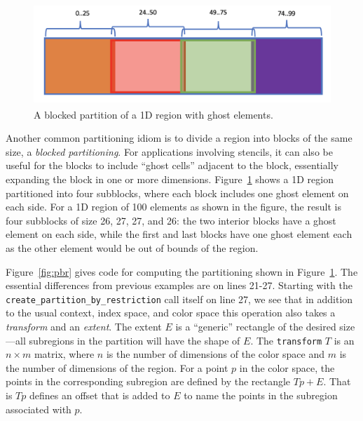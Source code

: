 \begin{figure}
  \includegraphics[height=1.5in]{figs/pbr.png}
  \caption{A blocked partition of a 1D region with ghost elements.}
  \label{fig:1dpbr}
\end{figure}

Another common partitioning idiom is to divide a region into blocks of the same size, a {\em blocked partitioning}.  For applications involving stencils, it can
also be useful for the blocks to include ``ghost cells'' adjacent to the block, essentially expanding the block in one or more dimensions.
Figure~\ref{fig:1dpbr} shows a 1D region partitioned into four subblocks, where each block includes one ghost element on each side.  For
a 1D region of 100 elements as shown in the figure, the result is four subblocks of size 26, 27, 27, and 26:  the two interior blocks have a ghost element on each side, while the first and last blocks have one ghost element each as the other element would be out of bounds of the region.

Figure~\ref{fig:pbr} gives code for computing the partitioning shown in Figure~\ref{fig:1dpbr}.  The essential differences from previous
  examples are on lines 21-27.  Starting with the {\tt create\_partition\_by\_restriction} call itself on line 27, we see that in addition to the
  usual context, index space, and color space this operation also takes a {\em transform} and an {\em extent}.  The extent $E$ is a ``generic''
  rectangle of the desired size---all subregions in the partition will have the shape of $E$.  The {\tt transform} $T$ is an
  $n \times m$ matrix, where $n$ is the number of dimensions of the color space and $m$ is the number of dimensions of the region.
  For a point $p$ in the color space, the points in the corresponding subregion are defined by the rectangle $Tp + E$.  That is $Tp$ defines
  an offset that is added to $E$ to name the points in the subregion associated with $p$.

